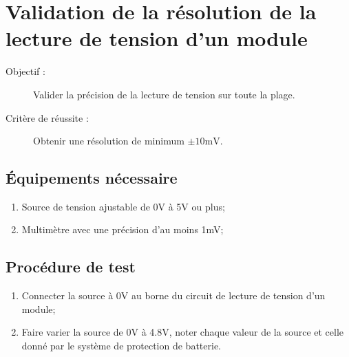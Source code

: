 
\section{Validation de la résolution de la lecture de tension d'un module}

	\begin{description}
		\item[Objectif :] Valider la précision de la lecture de tension sur toute la plage.
		\item[Critère de réussite :] Obtenir une résolution de minimum $\pm 10 \text{mV}$.
	\end{description}

	\subsection*{Équipements nécessaire}
	\begin{enumerate}
		\item Source de tension ajustable de 0V à 5V ou plus;
		\item Multimètre avec une précision d'au moins 1mV;
	\end{enumerate}	

	\subsection*{Procédure de test}
	\begin{enumerate}
		\item Connecter la source à 0V au borne du circuit de lecture de tension d'un module;
		\item Faire varier la source de 0V à 4.8V, noter chaque valeur de la source et celle donné par le système de protection de batterie.
	\end{enumerate}